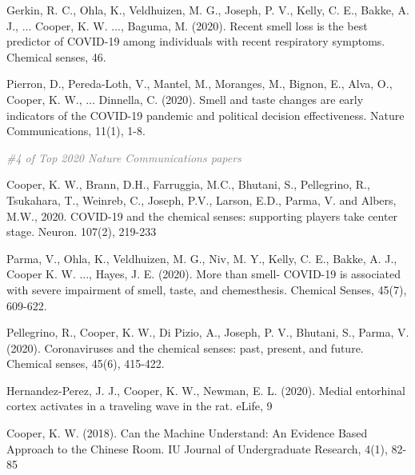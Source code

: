 \documentclass[10pt]{cooperCV2}
\begin{document}
\begin{etaremune}[ resume, itemindent=-\bibhang, topsep=0pt,
				   itemsep=\bibsep,partopsep=0pt,parsep=0pt,leftmargin={\bibhang+\widthof{[999]}}] 
    \item   Gerkin, R. C., Ohla, K., Veldhuizen, M. G., Joseph, P. V., Kelly, C. E., Bakke, A. J., ... Cooper, K. W. ..., Baguma, M. (2020). Recent smell loss is the best predictor of COVID-19 among individuals with recent respiratory symptoms. Chemical senses, 46.

    \item   Pierron, D., Pereda-Loth, V., Mantel, M., Moranges, M., Bignon, E., Alva, O.,  Cooper, K. W., ... Dinnella, C. (2020). Smell and taste changes are early indicators of the COVID-19 pandemic and political decision effectiveness. Nature Communications, 11(1), 1-8.
 \begin{innerlist}
     \item  \textcolor{grey}{\textit{ \#4 of Top 2020 Nature Communications papers} }
 \end{innerlist}

    \item Cooper, K. W., Brann, D.H., Farruggia, M.C., Bhutani, S., Pellegrino, R., Tsukahara, T., Weinreb, C., Joseph, P.V., Larson, E.D., Parma, V. and Albers, M.W., 2020. COVID-19 and the chemical senses: supporting players take center stage. Neuron. 107(2), 219-233

    \item Parma, V., Ohla, K., Veldhuizen, M. G., Niv, M. Y., Kelly, C. E., Bakke, A. J., Cooper K. W. ..., Hayes, J. E. (2020). More than smell- COVID-19 is associated with severe impairment of smell, taste, and chemesthesis. Chemical Senses, 45(7), 609-622.

    \item Pellegrino, R., Cooper, K. W., Di Pizio, A., Joseph, P. V., Bhutani, S., Parma, V. (2020). Coronaviruses and the chemical senses: past, present, and future. Chemical senses, 45(6), 415-422.

    \item Hernandez-Perez, J. J., Cooper, K. W., Newman, E. L. (2020). Medial entorhinal cortex activates in a traveling wave in the rat. eLife, 9

    \item Cooper, K. W. (2018). Can the Machine Understand: An Evidence Based Approach to the Chinese Room. IU Journal of Undergraduate Research, 4(1), 82-85

\end{etaremune}
\end{document}
